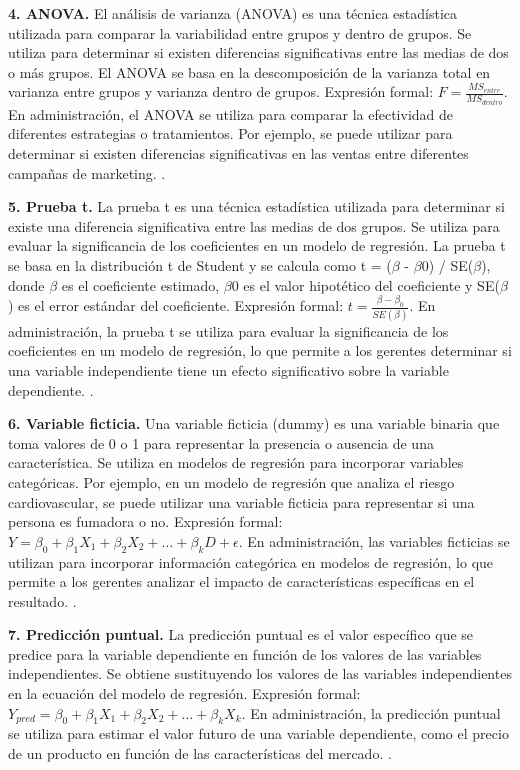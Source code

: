 {\textbf{4. ANOVA.} El análisis de varianza (ANOVA) es una técnica estadística utilizada para comparar la variabilidad entre grupos y dentro de grupos. Se utiliza para determinar si existen diferencias significativas entre las medias de dos o más grupos. El ANOVA se basa en la descomposición de la varianza total en varianza entre grupos y varianza dentro de grupos. Expresión formal: $F = \frac{MS_{entre}}{MS_{dentro}}$. En administración, el ANOVA se utiliza para comparar la efectividad de diferentes estrategias o tratamientos. Por ejemplo, se puede utilizar para determinar si existen diferencias significativas en las ventas entre diferentes campañas de marketing. \citep{anderson2012,lind2012,wackerly2010}.

\textbf{5. Prueba t.} La prueba t es una técnica estadística utilizada para determinar si existe una diferencia significativa entre las medias de dos grupos. Se utiliza para evaluar la significancia de los coeficientes en un modelo de regresión. La prueba t se basa en la distribución t de Student y se calcula como t = ($\beta$ - $\beta$0) / SE($\beta$), donde $\beta$ es el coeficiente estimado, $\beta$0 es el valor hipotético del coeficiente y SE($\beta$) es el error estándar del coeficiente. Expresión formal: $t = \frac{\beta - \beta_0}{SE(\beta)}$. En administración, la prueba t se utiliza para evaluar la significancia de los coeficientes en un modelo de regresión, lo que permite a los gerentes determinar si una variable independiente tiene un efecto significativo sobre la variable dependiente. \citep{anderson2012,lind2012,wackerly2010}.

\textbf{6. Variable ficticia.} Una variable ficticia (dummy) es una variable binaria que toma valores de 0 o 1 para representar la presencia o ausencia de una característica. Se utiliza en modelos de regresión para incorporar variables categóricas. Por ejemplo, en un modelo de regresión que analiza el riesgo cardiovascular, se puede utilizar una variable ficticia para representar si una persona es fumadora o no. Expresión formal: $Y = \beta_0 + \beta_1X_1 + \beta_2X_2 + \ldots + \beta_kD + \epsilon$. En administración, las variables ficticias se utilizan para incorporar información categórica en modelos de regresión, lo que permite a los gerentes analizar el impacto de características específicas en el resultado. \citep{anderson2012,lind2012,wackerly2010}.

\textbf{7. Predicción puntual.} La predicción puntual es el valor específico que se predice para la variable dependiente en función de los valores de las variables independientes. Se obtiene sustituyendo los valores de las variables independientes en la ecuación del modelo de regresión. Expresión formal: $Y_{pred} = \beta_0 + \beta_1X_1 + \beta_2X_2 + \ldots + \beta_kX_k$. En administración, la predicción puntual se utiliza para estimar el valor futuro de una variable dependiente, como el precio de un producto en función de las características del mercado. \citep{anderson2012,lind2012,wackerly2010}.

}
